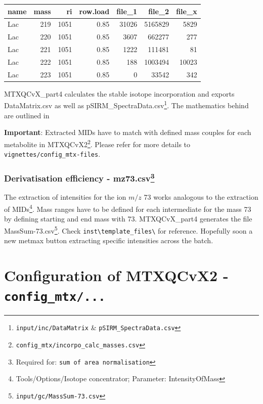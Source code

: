 \documentclass[]{book}
\let\rmarkdownfootnote\footnote%
\def\footnote{\protect\rmarkdownfootnote}
\begin{document}
\begin{tabular}{l|r|r|r|r|r|r}
\hline
name & mass & ri & row.load & file\_1 & file\_2 & file\_x\\
\hline
Lac & 219 & 1051 & 0.85 & 31026 & 5165829 & 5829\\
\hline
Lac & 220 & 1051 & 0.85 & 3607 & 662277 & 277\\
\hline
Lac & 221 & 1051 & 0.85 & 1222 & 111481 & 81\\
\hline
Lac & 222 & 1051 & 0.85 & 188 & 1003494 & 10023\\
\hline
Lac & 223 & 1051 & 0.85 & 0 & 33542 & 342\\
\hline
\end{tabular}

MTXQCvX\_part4 calculates the stable isotope incorporation and exports
DataMatrix.csv as well as pSIRM\_SpectraData.csv\footnote{\texttt{input/inc/DataMatrix}
  \& \texttt{pSIRM\_SpectraData.csv}}. The mathematics behind are
outlined in \citep{Pietzke2014}

\textbf{Important}: Extracted MIDs have to match with defined mass
couples for each metabolite in MTXQCvX2\footnote{\texttt{config\_mtx/incorpo\_calc\_masses.csv}}.
Please refer for more details to \texttt{vignettes/config\_mtx-files}.

\subsection[Derivatisation efficiency -
mz73.csv]{\texorpdfstring{Derivatisation efficiency - mz73.csv\footnote{Required
  for: \texttt{sum\ of\ area\ normalisation}}}{Derivatisation efficiency - mz73.csv}}\label{derivatisation-efficiency---mz73.csv}

The extraction of intensities for the ion \(m/z\) 73 works analogous to
the extraction of MIDs\footnote{Tools/Options/Isotope concentrator;
  Parameter: IntensityOfMass}. Mass ranges have to be defined for each
intermediate for the mass 73 by defining starting and end mass with 73.
MTXQCvX\_part4 generates the file MassSum-73.csv\footnote{\texttt{input/gc/MassSum-73.csv}}.
Check \texttt{inst\textbackslash{}template\_files\textbackslash{}} for
reference. Hopefully soon a new metmax button extracting specific
intensities across the batch.

\chapter{\texorpdfstring{Configuration of MTXQCvX2 -
\texttt{config\_mtx/...}}{Configuration of MTXQCvX2 - config\_mtx/...}}\label{configuration-of-mtxqcvx2---config_mtx...}
\end{document}
